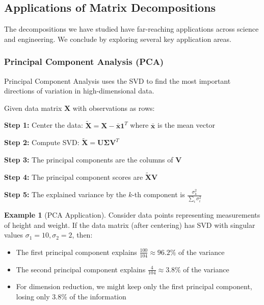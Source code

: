 \documentclass[12pt]{article}
\numberwithin{equation}{section}
\newcommand{\vect}[1]{\boldsymbol{#1}}   %
\newcommand{\mat}[1]{\mathbf{#1}}        %
\theoremstyle{plain}
\theoremstyle{definition}
\newtheorem{example}[theorem]{Example}
\theoremstyle{remark}
\begin{document}

\subsection{Applications of Matrix Decompositions}

The decompositions we have studied have far-reaching applications across science and engineering. We conclude by exploring several key application areas.

\subsubsection{Principal Component Analysis (PCA)}

Principal Component Analysis uses the SVD to find the most important directions of variation in high-dimensional data.

\begin{algorithm}[H]
\caption{PCA via SVD}
Given data matrix $\mat{X}$ with observations as rows:

\textbf{Step 1:} Center the data: $\tilde{\mat{X}} = \mat{X} - \bar{\vect{x}}\vect{1}^T$ where $\bar{\vect{x}}$ is the mean vector

\textbf{Step 2:} Compute SVD: $\tilde{\mat{X}} = \mat{U}\mat{\Sigma}\mat{V}^T$

\textbf{Step 3:} The principal components are the columns of $\mat{V}$

\textbf{Step 4:} The principal component scores are $\tilde{\mat{X}}\mat{V}$

\textbf{Step 5:} The explained variance by the $k$-th component is $\frac{\sigma_k^2}{\sum_i \sigma_i^2}$
\end{algorithm}

\begin{example}[PCA Application]
Consider data points representing measurements of height and weight. If the data matrix (after centering) has SVD with singular values $\sigma_1 = 10, \sigma_2 = 2$, then:

\begin{itemize}
\item The first principal component explains $\frac{100}{104} \approx 96.2\%$ of the variance
\item The second principal component explains $\frac{4}{104} \approx 3.8\%$ of the variance
\item For dimension reduction, we might keep only the first principal component, losing only 3.8\% of the information
\end{itemize}
\end{example}
\end{document}
